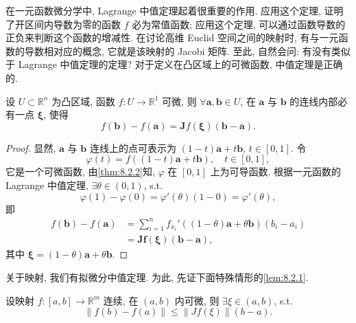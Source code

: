 在一元函数微分学中, Lagrange 中值定理起着很重要的作用. 应用这个定理, 证明了开区间内导数为零的函数 $f$ 必为常值函数; 应用这个定理, 可以通过函数导数的正负来判断这个函数的增减性. 在讨论高维 Euclid 空间之间的映射时, 有与一元函数的导数相对应的概念, 它就是该映射的 Jacobi 矩阵. 至此, 自然会问: 有没有类似于 Lagrange 中值定理的定理? 对于定义在凸区域上的可微函数, 中值定理是正确的.

\begin{theorem}[高维微分中值定理]\label{thm:8.2.8}
设 $U \subset \mathbb{R}^{n}$ 为凸区域, 函数 $f: U \to \mathbb{R}^{1}$ 可微, 则 $\forall \boldsymbol{a}, \boldsymbol{b} \in U$, 在 $\boldsymbol{a}$ 与 $\boldsymbol{b}$ 的连线内部必有一点 $\boldsymbol{\xi}$, 使得
\[
  f(\boldsymbol{b}) - f(\boldsymbol{a}) = \boldsymbol{J}f(\boldsymbol{\xi})(\boldsymbol{b} - \boldsymbol{a}).
\]
\end{theorem}

\begin{proof}
显然, $\boldsymbol{a}$ 与 $\boldsymbol{b}$ 连线上的点可表示为 $(1 - t)\boldsymbol{a} + t\boldsymbol{b}$, $t \in [0, 1]$. 令
\[
  \varphi(t) = f((1 - t)\boldsymbol{a} + t\boldsymbol{b}), \quad t \in [0, 1],
\]
它是一个可微函数, 由\cref{thm:8.2.2}知, $\varphi$ 在 $[0, 1]$ 上为可导函数. 根据一元函数的 Lagrange 中值定理, $\exists\theta \in (0, 1)$, s.t.
\[
  \varphi(1) - \varphi(0) = \varphi'(\theta)(1 - 0) = \varphi'(\theta),
\]
即
\begin{align*}
  f(\boldsymbol{b}) - f(\boldsymbol{a}) &= \sum_{i=1}^{n}f_{x_{i}}'((1 - \theta)\boldsymbol{a} + \theta\boldsymbol{b})(b_{i} - a_{i}) \\
  &= \boldsymbol{J}\boldsymbol{f}(\boldsymbol{\xi})(\boldsymbol{b} - \boldsymbol{a}),
\end{align*}
其中 $\boldsymbol{\xi} = (1 - \theta)\boldsymbol{a} + \theta\boldsymbol{b}$.
\end{proof}

关于映射, 我们有拟微分中值定理. 为此, 先证下面特殊情形的\cref{lem:8.2.1}.

\begin{lemma}\label{lem:8.2.1}
设映射 $f: [a, b] \to \mathbb{R}^{m}$ 连续, 在 $(a, b)$ 内可微, 则 $\exists\xi \in (a, b)$, s.t.
\[
  \|f(b) - f(a)\| \leqslant \|Jf(\xi)\|(b - a).
\]
\end{lemma}

